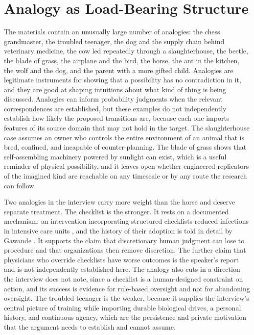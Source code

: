 \documentclass[11pt]{article}
\begin{document}
\section{Analogy as Load-Bearing Structure}

The materials contain an unusually large number of analogies: the chess grandmaster, the troubled teenager, the dog and the supply chain behind veterinary medicine, the cow led repeatedly through a slaughterhouse, the beetle, the blade of grass, the airplane and the bird, the horse, the ant in the kitchen, the wolf and the dog, and the parent with a more gifted child. Analogies are legitimate instruments for showing that a possibility has no contradiction in it, and they are good at shaping intuitions about what kind of thing is being discussed. Analogies can inform probability judgments when the relevant correspondences are established, but these examples do not independently establish how likely the proposed transitions are, because each one imports features of its source domain that may not hold in the target. The slaughterhouse case assumes an owner who controls the entire environment of an animal that is bred, confined, and incapable of counter-planning. The blade of grass shows that self-assembling machinery powered by sunlight can exist, which is a useful reminder of physical possibility, and it leaves open whether engineered replicators of the imagined kind are reachable on any timescale or by any route the research can follow.

Two analogies in the interview carry more weight than the horse and deserve separate treatment. The checklist is the stronger. It rests on a documented mechanism: an intervention incorporating structured checklists reduced infections in intensive care units \citep{pronovost2006}, and the history of their adoption is told in detail by Gawande \citeyearpar{gawande2009}. It supports the claim that discretionary human judgment can lose to procedure and that organizations then remove discretion. The further claim that physicians who override checklists have worse outcomes is the speaker's report and is not independently established here. The analogy also cuts in a direction the interview does not note, since a checklist is a human-designed constraint on action, and its success is evidence for rule-based oversight and not for abandoning oversight. The troubled teenager is the weaker, because it supplies the interview's central picture of training while importing durable biological drives, a personal history, and continuous agency, which are the persistence and private motivation that the argument needs to establish and cannot assume.
\end{document}

